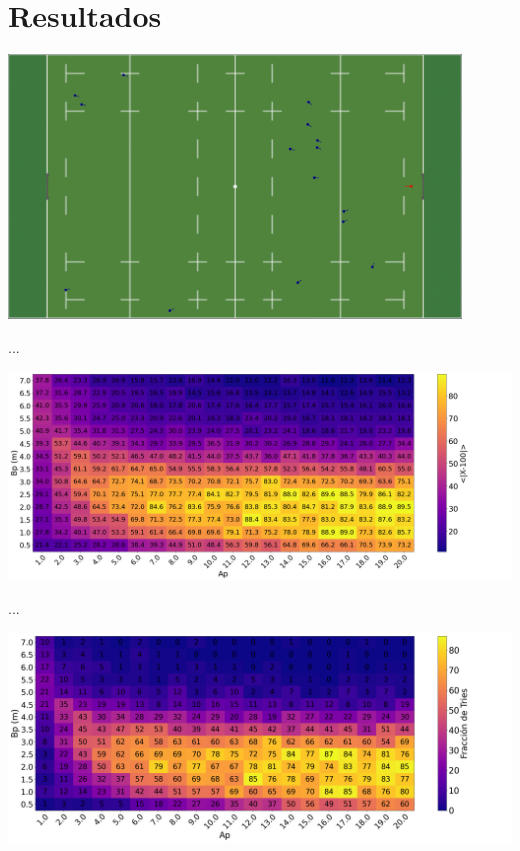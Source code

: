 \section{Resultados}\label{sec:resultados}

\begin{frame}
    \begin{center}
        \includegraphics[width=0.9\textwidth]{pic/05-resultados/animation-preview}
    \end{center}
\end{frame}

\begin{frame}{...}
    \begin{center}
        \includegraphics[width=\textwidth]{pic/05-resultados/r1}
    \end{center}
\end{frame}

\begin{frame}{...}
    \begin{center}
        \includegraphics[width=\textwidth]{pic/05-resultados/r2}
    \end{center}
\end{frame}

